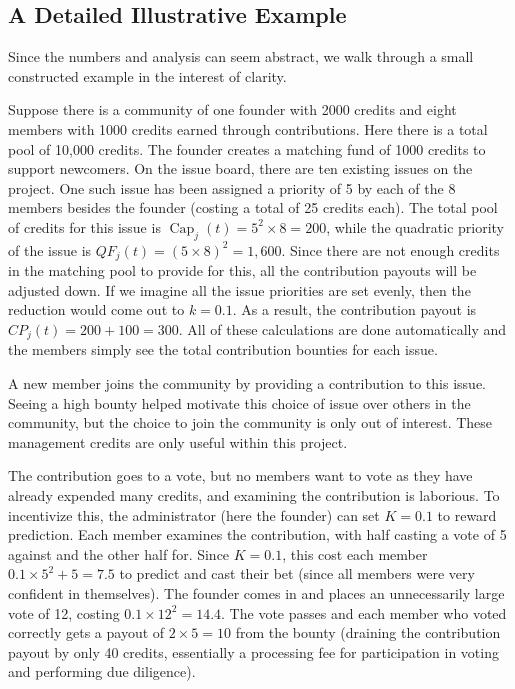 \documentclass{article}
\begin{document}
\subsection{A Detailed Illustrative Example}
Since the numbers and analysis can seem abstract, we walk through a small constructed example in the interest of clarity.

Suppose there is a community of one founder with 2000 credits and eight members with 1000 credits earned through contributions. Here there is a total pool of 10,000 credits. The founder creates a matching fund of 1000 credits to support newcomers. On the issue board, there are ten existing issues on the project. One such issue has been assigned a priority of 5 by each of the 8 members besides the founder (costing a total of 25 credits each). The total pool of credits for this issue is $\operatorname{Cap}_j(t) = 5^2 \times 8 = 200$, while the quadratic priority of the issue is $QF_j(t) = (5 \times 8)^2 = 1,600$. Since there are not enough credits in the matching pool to provide for this, all the contribution payouts will be adjusted down. If we imagine all the issue priorities are set evenly, then the reduction would come out to $k=0.1$. As a result, the contribution payout is $CP_j(t) = 200 + 100 = 300$. All of these calculations are done automatically and the members simply see the total contribution bounties for each issue.

A new member joins the community by providing a contribution to this issue. Seeing a high bounty helped motivate this choice of issue over others in the community, but the choice to join the community is only out of interest. These management credits are only useful within this project.

The contribution goes to a vote, but no members want to vote as they have already expended many credits, and examining the contribution is laborious. To incentivize this, the administrator (here the founder) can set $K=0.1$ to reward prediction. Each member examines the contribution, with half casting a vote of 5 against and the other half for. Since $K=0.1$, this cost each member $0.1 \times 5^2 + 5 = 7.5$ to predict and cast their bet (since all members were very confident in themselves). The founder comes in and places an unnecessarily large vote of 12, costing $0.1 \times 12^2 = 14.4$. The vote passes and each member who voted correctly gets a payout of $2 \times 5 = 10$ from the bounty (draining the contribution payout by only 40 credits, essentially a processing fee for participation in voting and performing due diligence).
\end{document}
